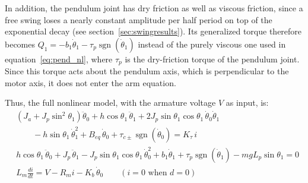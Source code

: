\documentclass[a4paper,11pt]{article}
\newcommand{\sgn}{\operatorname{sgn}}
\begin{document}
In addition, the pendulum joint has dry friction as well as viscous friction, since a free swing loses a nearly constant amplitude per half period on top of the exponential decay (see section~\ref{sec:swingresults}). Its generalized torque therefore becomes $Q_1 = -b_1 \dot\theta_1 - \tau_p \sgn(\dot\theta_1)$ instead of the purely viscous one used in equation~\ref{eq:pend_nl}, where $\tau_p$ is the dry-friction torque of the pendulum joint. Since this torque acts about the pendulum axis, which is perpendicular to the motor axis, it does not enter the arm equation.

Thus, the full nonlinear model, with the armature voltage $V$ as input, is:
\begin{equation}
\boxed{
\begin{aligned}
  & \left(J_a + J_p \sin^2\theta_1\right)\ddot\theta_0 + h \cos\theta_1\, \ddot\theta_1 + 2 J_p \sin\theta_1 \cos\theta_1\, \dot\theta_0 \dot\theta_1\\
  & \qquad - h \sin\theta_1\, \dot\theta_1^2 + B_{eq}\, \dot\theta_0 + \tau_{c\pm} \sgn(\dot\theta_0) = K_\tau\, i\\[4pt]
  & h \cos\theta_1\, \ddot\theta_0 + J_p\, \ddot\theta_1 - J_p \sin\theta_1 \cos\theta_1\, \dot\theta_0^2 + b_1 \dot\theta_1 + \tau_p \sgn(\dot\theta_1) - m g L_p \sin\theta_1 = 0\\[4pt]
  & L_m \frac{di}{dt} = V - R_m i - K_b\, \dot\theta_0 \qquad (i = 0 \text{ when } d = 0)
\end{aligned}
}
\label{eq:full_nl}
\end{equation}
\end{document}
